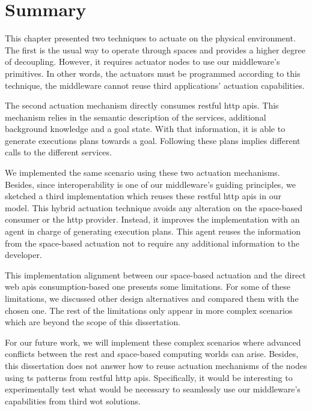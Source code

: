 \section{Summary}
\label{sec:actuation_summary}

This chapter presented two techniques to actuate on the physical environment.
The first is the usual way to operate through spaces and provides a higher degree of decoupling.
However, it requires actuator nodes to use our middleware's primitives. %
In other words, the actuators must be programmed according to this technique, the middleware cannot reuse third applications' actuation capabilities.


The second actuation mechanism directly consumes \ac{rest}ful \acs{http} \acsp{api}.
This mechanism relies in the semantic description of the services, additional background knowledge and a goal state. %
With that information, it is able to generate executions plans towards a goal.
Following these plans implies different calls to the different services.


We implemented the same scenario using these two actuation mechanisms.
Besides, since interoperability is one of our middleware's guiding principles, we sketched a third implementation which reuses these \ac{rest}ful \acs{http} \acsp{api} in our \Space{} model.
This hybrid actuation technique avoids any alteration on the space-based consumer or the \ac{http} provider.
Instead, it improves the \Space{} implementation with an agent in charge of generating execution plans.
This agent reuses the information from the space-based actuation not to require any additional information to the developer.


This implementation alignment between our space-based actuation and the direct web \acsp{api} consumption-based one presents some limitations.
For some of these limitations, we discussed other design alternatives and compared them with the chosen one.
The rest of the limitations only appear in more complex scenarios which are beyond the scope of this dissertation.


For our future work, we will implement these complex scenarios where advanced conflicts between the \ac{rest} and space-based computing worlds can arise.
Besides, this dissertation does not answer how to reuse actuation mechanisms of the nodes using \ac{ts} patterns from \ac{rest}ful \acs{http} \acsp{api}.
Specifically, it would be interesting to experimentally test what would be necessary to seamlessly use our middleware's capabilities from  third \ac{wot} solutions.